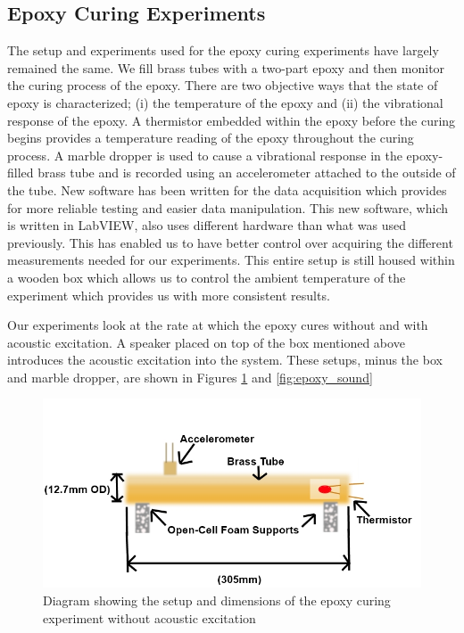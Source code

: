\documentclass[]{aiaa-tc}%
\begin{document}
\subsection{Epoxy Curing Experiments}
The setup and experiments used for the epoxy curing experiments have largely remained the same. We fill brass tubes with a two-part epoxy and then monitor the curing process of the epoxy. There are two objective ways that the state of epoxy is characterized; (i) the temperature of the epoxy and (ii) the vibrational response of the epoxy. A thermistor embedded within the epoxy before the curing begins provides a temperature reading of the epoxy throughout the curing process. A marble dropper is used to cause a vibrational response in the epoxy-filled brass tube and is recorded using an accelerometer attached to the outside of the tube. New software has been written for the data acquisition which provides for more reliable testing and easier data manipulation. This new software, which is written in LabVIEW, also uses different hardware than what was used previously. This has enabled us to have better control over acquiring the different measurements needed for our experiments. This entire setup is still housed within a wooden box which allows us to control the ambient temperature of the experiment which provides us with more consistent results. 

Our experiments look at the rate at which the epoxy cures without and with acoustic excitation. A speaker placed on top of the box mentioned above introduces the acoustic excitation into the system. These setups, minus the box and marble dropper, are shown in Figures \ref{fig:epoxy_no_sound} and \ref{fig:epoxy_sound}

\begin{figure}[H]%
\centering
 \includegraphics{epoxy_diagram_new}
 \caption{Diagram showing the setup and dimensions of the epoxy curing experiment without acoustic excitation}
 \label{fig:epoxy_no_sound}
\end{figure}
\end{document}
